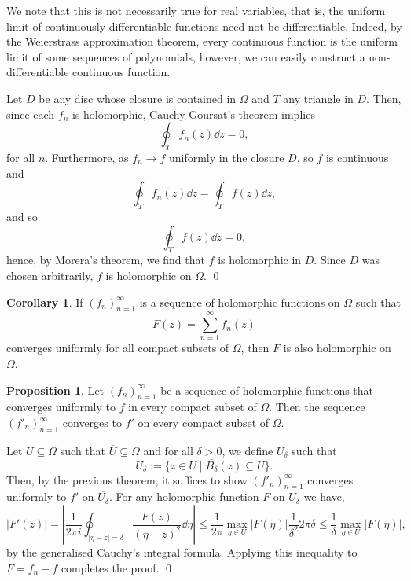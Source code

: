 \documentclass[
]{article}
\theoremstyle{definition}
\newtheorem{prop}{Proposition}
\newtheorem{corollary}{Corollary}[theorem]
\theoremstyle{definition}
\begin{document}
We note that this is not necessarily true for real variables, that is,
the uniform limit of continuously differentiable functions need not be
differentiable. Indeed, by the Weierstrass approximation theorem, every
continuous function is the uniform limit of some sequences of
polynomials, however, we can easily construct a non-differentiable
continuous function.

\proof

Let \(D\) be any disc whose closure is contained in \(\Omega\) and \(T\)
any triangle in \(D\). Then, since each \(f_n\) is holomorphic,
Cauchy-Goursat's theorem implies \[\oint_T f_n(z) \dd z = 0,\] for all
\(n\). Furthermore, as \(f_n \to f\) uniformly in the closure \(D\), so
\(f\) is continuous and \[\oint_T f_n(z) \dd z = \oint_T f(z) \dd z,\]
and so \[\oint_T f(z) \dd z  = 0,\] hence, by Morera's theorem, we find
that \(f\) is holomorphic in \(D\). Since \(D\) was chosen arbitrarily,
\(f\) is holomorphic on \(\Omega\). \qed

\begin{corollary}\label{sum_hol}
  If  \((f_n)_{n = 1}^\infty\) is a sequence of holomorphic functions on \(\Omega\) 
  such that 
  \[F(z) = \sum_{n = 1}^\infty f_n(z)\]
  converges uniformly for all compact subsets of \(\Omega\), then \(F\) is also 
  holomorphic on \(\Omega\).
\end{corollary}

\begin{prop}
  Let \((f_n)_{n = 1}^\infty\) be a sequence of holomorphic functions that converges 
  uniformly to \(f\) in every compact subset of \(\Omega\). Then the sequence 
  \((f'_n)_{n = 1}^\infty\) converges to \(f'\) on every compact subset of \(\Omega\).
\end{prop}
\proof

Let \(U \subseteq \Omega\) such that \(\overline{U} \subseteq \Omega\)
and for all \(\delta > 0\), we define \(U_\delta\) such that
\[U_\delta := \{z \in U \mid \overline{B_\delta}(z) \subseteq U\}.\]
Then, by the previous theorem, it suffices to show
\((f'_n)_{n = 1}^\infty\) converges uniformly to \(f'\) on
\(\overline{U_\delta}\). For any holomorphic function \(F\) on
\(U_\delta\) we have,
\[|F'(z)| = \left|\frac{1}{2\pi i} \oint_{|\eta - z| = 
    \delta}\frac{F(z)}{(\eta - z)^2} \dd \eta \right| 
    \le \frac{1}{2\pi}\max_{\eta \in U}|F(\eta)| \frac{1}{\delta^2} 2\pi\delta \le 
    \frac{1}{\delta}\max_{\eta \in U}|F(\eta)|,\] by the generalised
Cauchy's integral formula. Applying this inequality to \(F = f_n - f\)
completes the proof. \qed
\end{document}
